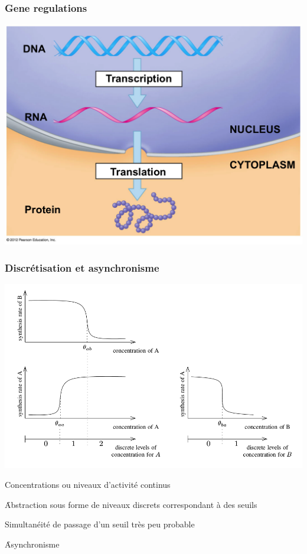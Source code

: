\begin{frame}[c]
  \frametitle{Gene regulations}

\begin{center}
  \includegraphics[width=.4\textwidth]{figs/protein.png}
\end{center}

\end{frame}



\begin{frame}[c]
  \frametitle{Discrétisation et asynchronisme}

\begin{center}
  \includegraphics[width=.8\textwidth]{figs/seuils.png}
\end{center}

\pause
Concentrations ou niveaux d'activité continus

\quad \f Abstraction sous forme de niveaux discrets correspondant à des seuils

\pause
\medskip
Simultanéité de passage d'un seuil très peu probable

\quad \f Asynchronisme

\end{frame}